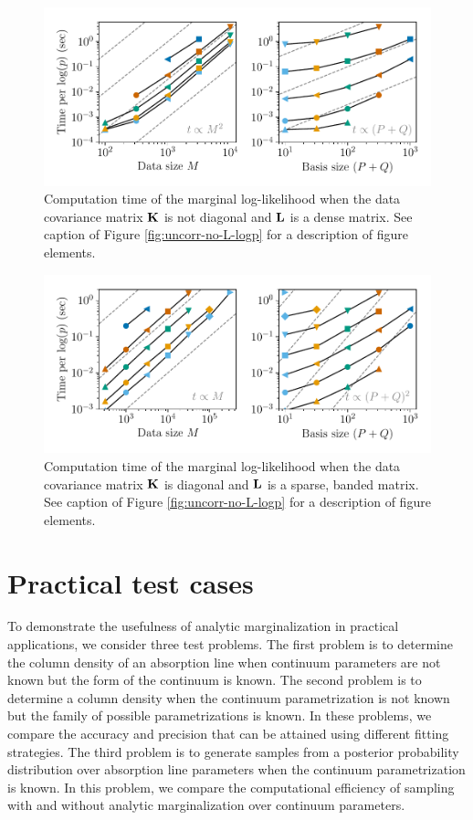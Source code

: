 \documentclass[manuscript]{aastex62}
\newcommand{\vx}[1]{{\bf {#1}}}
\begin{document}
\begin{figure}
  \includegraphics{corr_yes_L_scaling.pdf}
  \caption{Computation time of the marginal log-likelihood when the data covariance matrix $\vx{K}$ is not diagonal and $\vx{L}$ is a dense matrix. See caption of Figure \ref{fig:uncorr-no-L-logp} for a description of figure elements.}
  \label{fig:corr-yes-L-logp}
\end{figure}

\begin{figure}
  \includegraphics{uncorr_sparse_L_scaling.pdf}
  \caption{Computation time of the marginal log-likelihood when the data covariance matrix $\vx{K}$ is diagonal and $\vx{L}$ is a sparse, banded matrix. See caption of Figure \ref{fig:uncorr-no-L-logp} for a description of figure elements.}
  \label{fig:uncorr-sparse-L-logp}
\end{figure}

\section{Practical test cases}
\label{sec:test-cases}
To demonstrate the usefulness of analytic marginalization in practical applications, we consider three test problems.
The first problem is to determine the column density of an absorption line when continuum parameters are not known but the form of the continuum is known.
The second problem is to determine a column density when the continuum parametrization is not known but the family of possible parametrizations is known.
In these problems, we compare the accuracy and precision that can be attained using different fitting strategies.
The third problem is to generate samples from a posterior probability distribution over absorption line parameters when the continuum parametrization is known.
In this problem, we compare the computational efficiency of sampling with and without analytic marginalization over continuum parameters.
\end{document}

